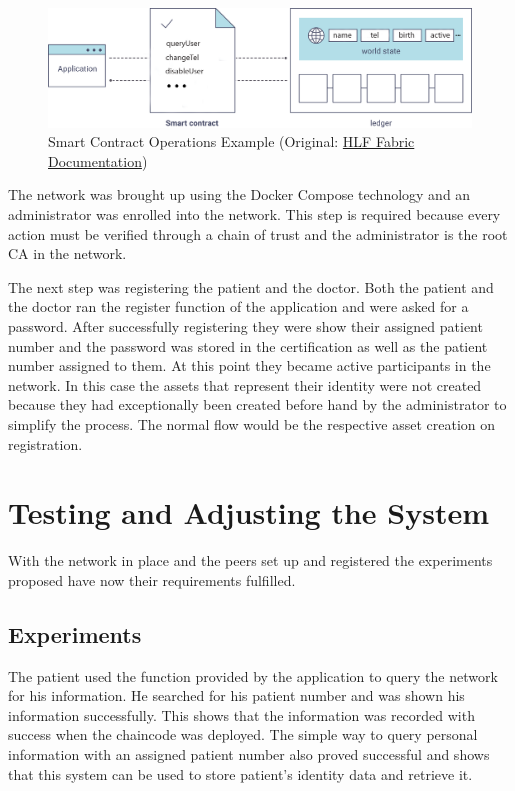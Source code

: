 \begin{figure}[ht] 
  \centering
  \includegraphics[width=1\linewidth]{imgs/smartContractOverview.png}
  \caption{\label{fig:smartContractOverview}Smart Contract Operations Example
  (Original:
  \href{http://hyperledger-fabric.readthedocs.io/en/latest/write_first_app.html}{HLF
  Fabric Documentation})} 
\end{figure}

The network was brought up using the Docker Compose technology and an
administrator was enrolled into the network. This step is required because
every action must be verified through a chain of trust and the administrator is
the root CA in the network.

The next step was registering the patient and the doctor. Both the patient and
the doctor ran the register function of the application and were asked for a
password. After successfully registering they were show their assigned patient
number and the password was stored in the certification as well as the patient
number assigned to them. At this point they became active participants in the
network. In this case the assets that represent their identity were not created
because they had exceptionally been created before hand by the administrator to
simplify the process. The normal flow would be the respective asset creation on
registration.

\section{Testing and Adjusting the System}

With the network in place and the peers set up and registered the experiments
proposed have now their requirements fulfilled.

\subsection{Experiments}

The patient used the function provided by the application to query the network
for his information. He searched for his patient number and was shown his
information successfully. This shows that the information was recorded with
success when the chaincode was deployed. The simple way to query personal
information with an assigned patient number also proved successful and shows
that this system can be used to store patient's identity data and retrieve it.

